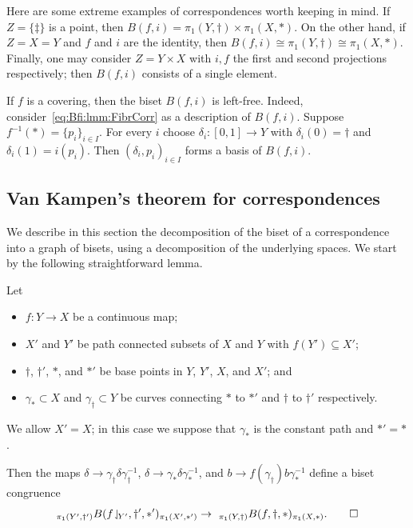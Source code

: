 \documentclass{amsart}
\begin{document}
\begin{exple}
  Here are some extreme examples of correspondences worth keeping in
  mind.  If $Z=\{\ddagger\}$ is a point, then
  $B(f,i)=\pi_1(Y,\dagger)\times\pi_1(X,*)$. On the other hand, if
  $Z=X=Y$ and $f$ and $i$ are the identity, then
  $B(f,i)\cong\pi_1(Y,\dagger)\cong\pi_1(X,*)$. Finally, one may
  consider $Z=Y\times X$ with $i,f$ the first and second projections
  respectively; then $B(f,i)$ consists of a single element.
\end{exple}

If $f$ is a covering, then the biset $B(f,i)$ is left-free. Indeed,
consider~\eqref{eq:Bfi:lmm:FibrCorr} as a description of
$B(f,i)$. Suppose $f^{-1}(*)=\{p_i\}_{i\in I}$. For every $i$ choose
$\delta_i\colon[0,1]\to Y$ with $\delta_i(0)=\dagger$ and
$\delta_i(1)=i(p_i)$.  Then $(\delta_i,p_i)_{i\in I}$ forms a basis of
$B(f,i)$.




\subsection{Van Kampen's theorem for correspondences}
\label{ss:VanKampCorr}
We describe in this section the decomposition of the biset of a
correspondence into a graph of bisets, using a decomposition of the
underlying spaces. We start by the following straightforward lemma.

\begin{lem}\label{lm:BisMorph}\pushQED{\qed}
  Let
  \begin{itemize}
  \item $f\colon Y\to X$ be a continuous map;
  \item $X'$ and $Y'$ be path connected subsets of $X$ and $Y$ with
    $f(Y')\subseteq X'$;
  \item $\dagger$, $\dagger'$, $*$, and $*'$ be base points in $Y$,
    $Y'$, $X$, and $X'$; and
  \item $\gamma_*\subset X$ and $\gamma_\dagger \subset Y$ be curves
    connecting $*$ to $*'$ and $\dagger$ to $\dagger'$ respectively.
  \end{itemize}
  We allow $X'=X$; in this case we suppose that $\gamma_*$ is the constant
  path and $*'=*$.
 
  Then the maps $\delta\to\gamma_\dagger\delta \gamma^{-1}_\dagger$, $\delta\to
  \gamma_*\delta \gamma^{-1}_*$, and $b\to f(\gamma_\dagger ) b \gamma^{-1}_*$
  define a biset congruence
  \[_{\pi_1(Y',\dagger')}B(f\restrict{Y'},\dagger',*')_{\pi_1(X',*')}\to\ _{\pi_1(Y,\dagger)}B(f,\dagger,*)_{\pi_1(X,*)}.\qedhere\]
\end{lem}
\end{document}
